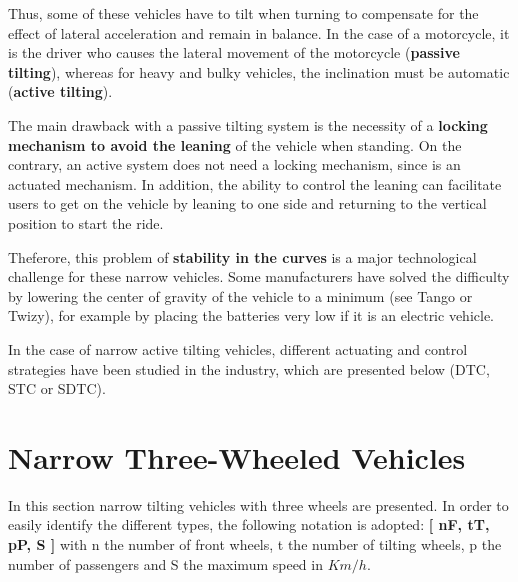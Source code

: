 Thus, some of these vehicles have to tilt when turning to compensate for the effect of lateral acceleration and remain in balance. In the case of a motorcycle, it is the driver who causes the lateral movement of the motorcycle (\textbf{passive tilting}), whereas for heavy and bulky vehicles, the inclination must be automatic (\textbf{active tilting}). 

The main drawback with a passive tilting system is the necessity of a \textbf{locking mechanism to avoid the leaning} of the vehicle when standing. On the contrary, an active system does not need a locking mechanism, since is an actuated mechanism. In addition, the ability to control the leaning can facilitate users to get on the vehicle by leaning to one side and returning to the vertical position to start the ride.

Theferore, this problem of \textbf{stability in the curves} is a major technological challenge for these narrow vehicles. Some manufacturers have solved the difficulty by lowering the center of gravity of the vehicle to a minimum (see Tango\cite{tango} or Twizy\cite{twizy}), for example by placing the batteries very low if it is an electric vehicle. 

In the case of narrow active tilting vehicles, different actuating and control strategies have been studied in the industry, which are presented below (DTC, STC or SDTC).

\section{Narrow Three-Wheeled Vehicles}

In this section narrow tilting vehicles with three wheels are presented. In order to easily identify the different types, the following notation is adopted: \textbf{[ nF, tT, pP, S ]} with n the number of front wheels, t the number of tilting wheels, p the number of passengers and S the maximum speed in $Km / h$.

